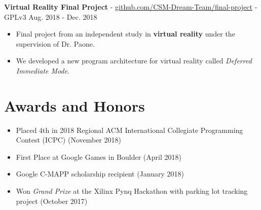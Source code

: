 \documentclass[10pt,letterpaper]{article}
\begin{document}
\textbf{Virtual Reality Final Project} -
\href{https://github.com/CSM-Dream-Team/final-project}{github.com/CSM-Dream-Team/final-project}
- GPLv3 \hfill Aug. 2018 - Dec. 2018
\begin{itemize}
    \item Final project from an independent study in \textbf{virtual reality}
        under the supervision of Dr. Paone.
    \item We developed a new program architecture for virtual reality called
        \textit{Deferred Immediate Mode}.
\end{itemize}

\section*{Awards and Honors}
\begin{itemize}
    \item Placed 4th in 2018 Regional ACM International Collegiate Programming
        Contest (ICPC) (November 2018)
    \item First Place at Google Games in Boulder (April 2018)
    \item Google C-MAPP scholarship recipient (January 2018)
    \item Won \textit{Grand Prize} at the Xilinx Pynq Hackathon with parking lot
        tracking project (October 2017)
\end{itemize}
\end{document}
